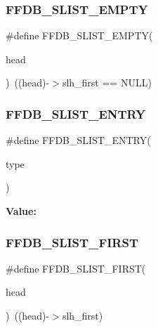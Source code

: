 \subsubsection{\texorpdfstring{FFDB\_SLIST\_EMPTY}{FFDB\_SLIST\_EMPTY}}
{\footnotesize\ttfamily \#define F\+F\+D\+B\+\_\+\+S\+L\+I\+S\+T\+\_\+\+E\+M\+P\+TY(\begin{DoxyParamCaption}\item[{}]{head }\end{DoxyParamCaption})~((head)-\/$>$slh\+\_\+first == N\+U\+LL)}

\mbox{\label{adat-devel_2other__libs_2filedb_2filehash_2ffdb__cq_8h_a2e31500f2c8eef196f7aa17f1223068a}} 
\subsubsection{\texorpdfstring{FFDB\_SLIST\_ENTRY}{FFDB\_SLIST\_ENTRY}}
{\footnotesize\ttfamily \#define F\+F\+D\+B\+\_\+\+S\+L\+I\+S\+T\+\_\+\+E\+N\+T\+RY(\begin{DoxyParamCaption}\item[{}]{type }\end{DoxyParamCaption})}

{\bfseries Value\+:}
\begin{DoxyCode}{0}
\DoxyCodeLine{\textcolor{keyword}{struct }\{                                \(\backslash\)}
\DoxyCodeLine{\}}

\end{DoxyCode}
\mbox{\label{adat-devel_2other__libs_2filedb_2filehash_2ffdb__cq_8h_ae564430fafc00c6a8e841a220d582904}} 
\subsubsection{\texorpdfstring{FFDB\_SLIST\_FIRST}{FFDB\_SLIST\_FIRST}}
{\footnotesize\ttfamily \#define F\+F\+D\+B\+\_\+\+S\+L\+I\+S\+T\+\_\+\+F\+I\+R\+ST(\begin{DoxyParamCaption}\item[{}]{head }\end{DoxyParamCaption})~((head)-\/$>$slh\+\_\+first)}


